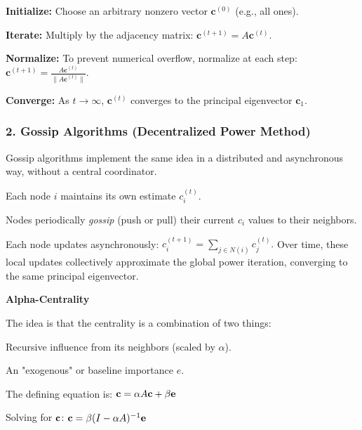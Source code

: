 \begin{tightitemize}
    \item \textbf{Initialize:} Choose an arbitrary nonzero vector $\mathbf{c}^{(0)}$ (e.g., all ones).
    \item \textbf{Iterate:} Multiply by the adjacency matrix:
    $
    \mathbf{c}^{(t+1)} = A \mathbf{c}^{(t)}.
    $
    \item \textbf{Normalize:} To prevent numerical overflow, normalize at each step:
    $
    \mathbf{c}^{(t+1)} = \frac{A \mathbf{c}^{(t)}}{\|A \mathbf{c}^{(t)}\|}.
    $
    \item \textbf{Converge:} As $t \to \infty$, $\mathbf{c}^{(t)}$ converges to the principal eigenvector $\mathbf{c}_1$.  

\end{tightitemize}

\subsubsection*{2. Gossip Algorithms (Decentralized Power Method)}
Gossip algorithms implement the same idea in a distributed and asynchronous way, without a central coordinator.

\begin{tightitemize}
    \item Each node $i$ maintains its own estimate $c_i^{(t)}$.
    \item Nodes periodically \emph{gossip} (push or pull) their current $c_i$ values to their neighbors.
    \item Each node updates asynchronously:
    $
    c_i^{(t+1)} = \sum_{j \in N(i)} c_j^{(t)}.
    $
    Over time, these local updates collectively approximate the global power iteration, converging to the same principal eigenvector.
\end{tightitemize}

\textbf{Alpha-Centrality}

The idea is that the centrality is a combination of two things:

\begin{tightitemize}
    \item Recursive influence from its neighbors (scaled by $\alpha$).
    \item An "exogenous" or baseline importance $e$.
\end{tightitemize}

The defining equation is:
$
\mathbf{c} = \alpha A \mathbf{c} + \beta \mathbf{e}
$

Solving for $\mathbf{c}$:
$
\mathbf{c} = \beta (I - \alpha A)^{-1} \mathbf{e}
$

